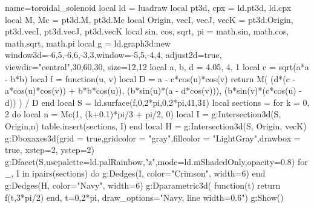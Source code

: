 \documentclass{standalone}
\begin{document}
\begin{luadraw}{name=toroidal_solenoid}
local ld = luadraw
local pt3d, cpx = ld.pt3d, ld.cpx
local M, Mc = pt3d.M, pt3d.Mc
local Origin, vecI, vecJ, vecK = pt3d.Origin, pt3d.vecI, pt3d.vecJ, pt3d.vecK
local sin, cos, sqrt, pi = math.sin, math.cos, math.sqrt, math.pi
local g = ld.graph3d:new{ window3d={-6,5,-6,6,-3,3},window={-5,5,-4,4}, adjust2d=true, 
    viewdir={"central",30,60,30}, size={12,12} }
local a, b, d = 4.05, 4, 1
local c = sqrt(a*a - b*b)
local f = function(u, v)
    local D = a - c*cos(u)*cos(v)
    return M(
        (d*(c - a*cos(u)*cos(v)) + b*b*cos(u)),
        (b*sin(u)*(a - d*cos(v))),
        (b*sin(v)*(c*cos(u) - d)) ) / D
end
local S =  ld.surface(f,0,2*pi,0,2*pi,{41,31})
local sections = {}
for k = 0, 2 do
    local n = Mc(1, (k+0.1)*pi/3 + pi/2, 0)
    local I = g:Intersection3d(S, {Origin,n})
    table.insert(sections, I)
end
local H = g:Intersection3d(S, {Origin, vecK})
g:Dboxaxes3d({grid = true,gridcolor = "gray",fillcolor = "LightGray",drawbox = true,
    xstep=2, ystep=2})
g:Dfacet(S,{usepalette={ld.palRainbow,"z"},mode=ld.mShadedOnly,opacity=0.8})
for _, I in ipairs(sections) do
    g:Dedges(I, {color="Crimson", width=6})
end
g:Dedges(H, {color="Navy", width=6})
g:Dparametric3d( function(t) return f(t,3*pi/2) end, {t={0,2*pi}, draw_options="Navy, line width=0.6"})
g:Show()
\end{luadraw}
\end{document}
